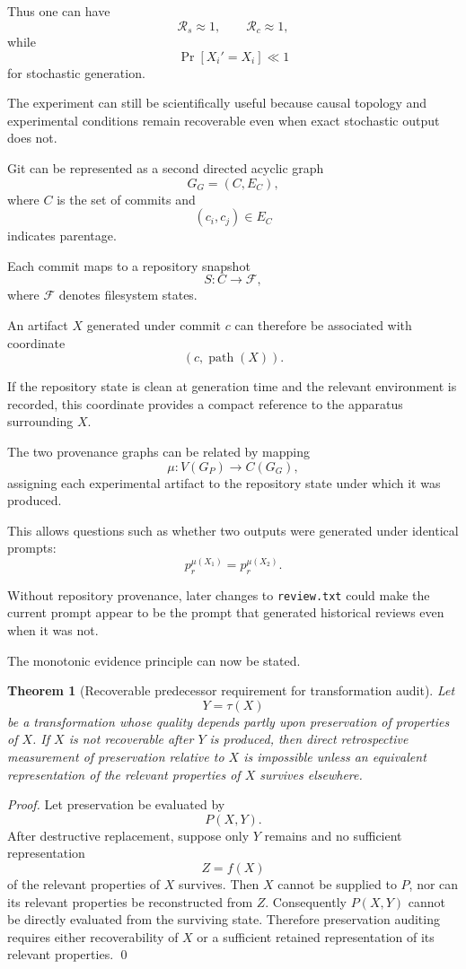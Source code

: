 \documentclass[11pt]{article}
\newtheorem{theorem}[definition]{Theorem}
\begin{document}
Thus one can have
\[
    \mathcal{R}_s\approx1,
    \qquad
    \mathcal{R}_c\approx1,
\]
while
\[
    \Pr[X_i'=X_i]\ll1
\]
for stochastic generation.

The experiment can still be scientifically useful because causal topology and experimental conditions remain recoverable even when exact stochastic output does not.

Git can be represented as a second directed acyclic graph
\[
    G_G=(C,E_C),
\]
where \(C\) is the set of commits and
\[
    (c_i,c_j)\in E_C
\]
indicates parentage.

Each commit maps to a repository snapshot
\[
    S:C\rightarrow\mathcal{F},
\]
where \(\mathcal{F}\) denotes filesystem states.

An artifact \(X\) generated under commit \(c\) can therefore be associated with coordinate
\[
    (c,\operatorname{path}(X)).
\]

If the repository state is clean at generation time and the relevant environment is recorded, this coordinate provides a compact reference to the apparatus surrounding \(X\).

The two provenance graphs can be related by mapping
\[
    \mu:V(G_P)\rightarrow C(G_G),
\]
assigning each experimental artifact to the repository state under which it was produced.

This allows questions such as whether two outputs were generated under identical prompts:
\[
    p_r^{\mu(X_1)}
    =
    p_r^{\mu(X_2)}.
\]

Without repository provenance, later changes to \texttt{review.txt} could make the current prompt appear to be the prompt that generated historical reviews even when it was not.

The monotonic evidence principle can now be stated.

\begin{theorem}[Recoverable predecessor requirement for transformation audit]
Let
\[
    Y=\tau(X)
\]
be a transformation whose quality depends partly upon preservation of properties of \(X\). If \(X\) is not recoverable after \(Y\) is produced, then direct retrospective measurement of preservation relative to \(X\) is impossible unless an equivalent representation of the relevant properties of \(X\) survives elsewhere.
\end{theorem}

\begin{proof}
Let preservation be evaluated by
\[
    P(X,Y).
\]
After destructive replacement, suppose only \(Y\) remains and no sufficient representation
\[
    Z=f(X)
\]
of the relevant properties of \(X\) survives. Then \(X\) cannot be supplied to \(P\), nor can its relevant properties be reconstructed from \(Z\). Consequently \(P(X,Y)\) cannot be directly evaluated from the surviving state. Therefore preservation auditing requires either recoverability of \(X\) or a sufficient retained representation of its relevant properties. \qed
\end{proof}
\end{document}
